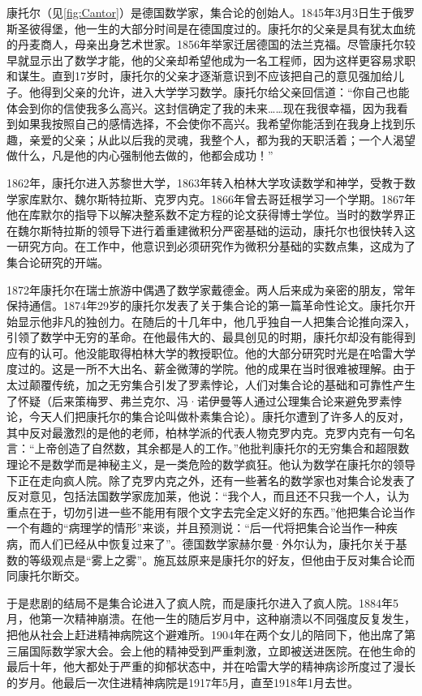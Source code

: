 \documentclass[b5paper]{ctexart}
\begin{document}
\begin{mdframed}
康托尔（见\ref{fig:Cantor}）是德国数学家，集合论的创始人。1845年3月3日生于俄罗斯圣彼得堡，他一生的大部分时间是在德国度过的。康托尔的父亲是具有犹太血统的丹麦商人，母亲出身艺术世家。1856年举家迁居德国的法兰克福。尽管康托尔较早就显示出了数学才能，他的父亲却希望他成为一名工程师，因为这样更容易求职和谋生。直到17岁时，康托尔的父亲才逐渐意识到不应该把自己的意见强加给儿子。他得到父亲的允许，进入大学学习数学。康托尔给父亲回信道：“你自己也能体会到你的信使我多么高兴。这封信确定了我的未来……现在我很幸福，因为我看到如果我按照自己的感情选择，不会使你不高兴。我希望你能活到在我身上找到乐趣，亲爱的父亲；从此以后我的灵魂，我整个人，都为我的天职活着；一个人渴望做什么，凡是他的内心强制他去做的，他都会成功！”\cite{HanXueTao16}

1862年，康托尔进入苏黎世大学，1863年转入柏林大学攻读数学和神学，受教于数学家库默尔、魏尔斯特拉斯、克罗内克。1866年曾去哥廷根学习一个学期。1867年他在库默尔的指导下以解决整系数不定方程的论文获得博士学位。当时的数学界正在魏尔斯特拉斯的领导下进行着重建微积分严密基础的运动，康托尔也很快转入这一研究方向。在工作中，他意识到必须研究作为微积分基础的实数点集，这成为了集合论研究的开端。

1872年康托尔在瑞士旅游中偶遇了数学家戴德金。两人后来成为亲密的朋友，常年保持通信。1874年29岁的康托尔发表了关于集合论的第一篇革命性论文。康托尔开始显示他非凡的独创力。在随后的十几年中，他几乎独自一人把集合论推向深入，引领了数学中无穷的革命。在他最伟大的、最具创见的时期，康托尔却没有能得到应有的认可。他没能取得柏林大学的教授职位。他的大部分研究时光是在哈雷大学度过的。这是一所不大出名、薪金微薄的学院。他的成果在当时很难被理解。由于太过颠覆传统，加之无穷集合引发了罗素悖论，人们对集合论的基础和可靠性产生了怀疑（后来策梅罗、弗兰克尔、冯·诺伊曼等人通过公理集合论来避免罗素悖论，今天人们把康托尔的集合论叫做朴素集合论）。康托尔遭到了许多人的反对，其中反对最激烈的是他的老师，柏林学派的代表人物克罗内克。克罗内克有一句名言：“上帝创造了自然数，其余都是人的工作。”他批判康托尔的无穷集合和超限数理论不是数学而是神秘主义，是一类危险的数学疯狂。他认为数学在康托尔的领导下正在走向疯人院。除了克罗内克之外，还有一些著名的数学家也对集合论发表了反对意见，包括法国数学家庞加莱，他说：“我个人，而且还不只我一个人，认为重点在于，切勿引进一些不能用有限个文字去完全定义好的东西。”他把集合论当作一个有趣的“病理学的情形”来谈，并且预测说：“后一代将把集合论当作一种疾病，而人们已经从中恢复过来了”。德国数学家赫尔曼·外尔认为，康托尔关于基数的等级观点是“雾上之雾”。施瓦兹原来是康托尔的好友，但他由于反对集合论而同康托尔断交。

于是悲剧的结局不是集合论进入了疯人院，而是康托尔进入了疯人院。1884年5月，他第一次精神崩溃。在他一生的随后岁月中，这种崩溃以不同强度反复发生，把他从社会上赶进精神病院这个避难所。1904年在两个女儿的陪同下，他出席了第三届国际数学家大会。会上他的精神受到严重刺激，立即被送进医院。在他生命的最后十年，他大都处于严重的抑郁状态中，并在哈雷大学的精神病诊所度过了漫长的岁月。他最后一次住进精神病院是1917年5月，直至1918年1月去世。


\end{mdframed}
\end{document}
